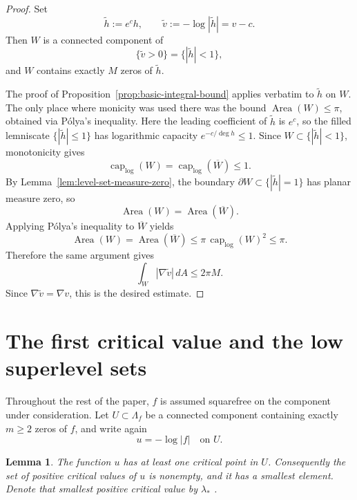 \documentclass[12pt]{amsart}
\theoremstyle{definition}
\newtheorem{lemma}[theorem]{Lemma}
\theoremstyle{remark}
\begin{document}
\begin{proof}
Set
\[
\widetilde h:=e^c h,
\qquad
\widetilde v:=-\log|\widetilde h|=v-c.
\]
Then $W$ is a connected component of
\[
\{\widetilde v>0\}=\{|\widetilde h|<1\},
\]
and $W$ contains exactly $M$ zeros of $\widetilde h$.

The proof of Proposition~\ref{prop:basic-integral-bound} applies verbatim to $\widetilde h$ on $W$. The only place where monicity was used there was the bound $\operatorname{Area}(W)\le \pi$, obtained via P\'olya's inequality. Here the leading coefficient of $\widetilde h$ is $e^c$, so the filled lemniscate $\{|\widetilde h|\le 1\}$ has logarithmic capacity $e^{-c/\deg h}\le 1$. Since $W\subset \{|\widetilde h|<1\}$, monotonicity gives
\[
\operatorname{cap}_{\log}(W)=\operatorname{cap}_{\log}(\overline W)\le 1.
\]
By Lemma~\ref{lem:level-set-measure-zero}, the boundary $\partial W\subset \{|\widetilde h|=1\}$ has planar measure zero, so
\[
\operatorname{Area}(W)=\operatorname{Area}(\overline W).
\]
Applying P\'olya's inequality to $\overline W$ yields
\[
\operatorname{Area}(W)=\operatorname{Area}(\overline W)
\le
\pi\,\operatorname{cap}_{\log}(W)^2
\le
\pi.
\]
Therefore the same argument gives
\[
\int_W |\nabla \widetilde v|\,dA\le 2\pi M.
\]
Since $\nabla \widetilde v=\nabla v$, this is the desired estimate.
\end{proof}

\section{The first critical value and the low superlevel sets}

Throughout the rest of the paper, $f$ is assumed squarefree on the component under consideration.
Let $U\subset \Lambda_f$ be a connected component containing exactly $m\ge 2$ zeros of $f$, and write again
\[
 u=-\log|f|\quad\text{on }U.
\]

\medskip
\begin{lemma}\label{lem:first-positive-critical-value}
\emph{The function $u$ has at least one critical point in $U$. Consequently the set of positive
critical values of $u$ is nonempty, and it has a smallest element. Denote that smallest positive critical
value by $\lambda_*$ .}
\end{lemma}
\end{document}
